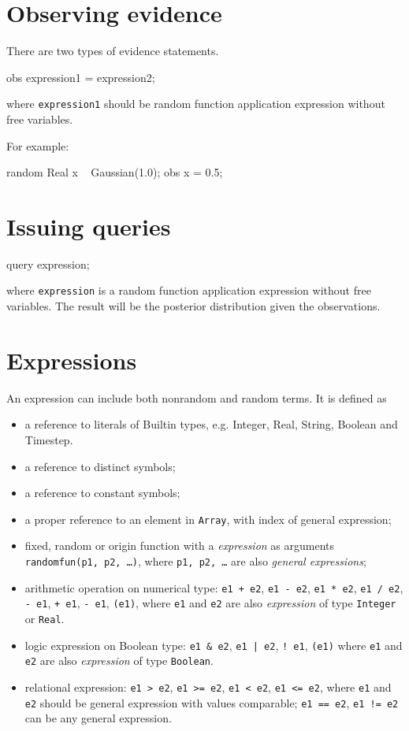 \documentclass[12pt]{article}
\begin{document}
\section{Observing evidence}
There are two types of evidence statements.
\begin{blogcode}
obs expression1 = expression2;
\end{blogcode}
where \texttt{expression1} should be random function application expression without free variables. 

For example:
\begin{blogcode}
random Real x ~ Gaussian(1.0);
obs x = 0.5;
\end{blogcode}

\section{Issuing queries}
\begin{blogcode}
query expression;
\end{blogcode}
where \texttt{expression} is a random function application expression without free variables. The result will be the posterior distribution given the observations. 

\section{Expressions}
\label{sec:expression}
An expression can include both nonrandom and random terms.
It is defined as
\begin{itemize}
\item a reference to literals of Builtin types, e.g. Integer, Real, String, Boolean and Timestep.
\item a reference to distinct symbols;
\item a reference to constant symbols;
\item a proper reference to an element in {\tt Array}, with index of general expression;
 \item fixed, random or origin function with a \emph{expression} as arguments {\tt randomfun(p1, p2, \dots)},
  where {\tt p1, p2, \dots} are also \emph{general expressions};
\item arithmetic operation on numerical type: \texttt{e1 + e2}, \texttt{e1 - e2}, \texttt{e1 * e2}, \texttt{e1 / e2},  \texttt{- e1}, \texttt{+ e1}, \texttt{- e1}, \texttt{(e1)}, where \texttt{e1} and \texttt{e2} are also \emph{expression} of type \texttt{Integer} or \texttt{Real}.
\item logic expression on Boolean type: \texttt{e1 \& e2}, \texttt{e1 | e2}, \texttt{! e1}, \texttt{(e1)} where 
\texttt{e1} and \texttt{e2} are also \emph{expression} of type \texttt{Boolean}.
\item relational expression: \texttt{e1 > e2}, \texttt{e1 >= e2}, \texttt{e1 < e2}, \texttt{e1 <= e2}, where \texttt{e1} and \texttt{e2} should be general expression with values comparable; \texttt{e1 == e2}, \texttt{e1 != e2} can be any general expression.
\end{itemize}
\end{document}
